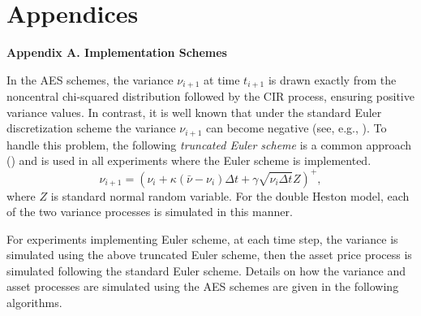 \documentclass[]{interact}
\theoremstyle{plain}%
\theoremstyle{definition}
\theoremstyle{remark}
\begin{document}
\section{Appendices}


\noindent\textbf{Appendix A. Implementation Schemes}\medskip

In the AES schemes, the variance $\nu_{i+1}$ at time $t_{i+1}$ is drawn exactly from the noncentral chi-squared distribution followed by the CIR process, ensuring positive variance values. In contrast, it is well known that under the standard Euler discretization scheme the variance $\nu_{i+1}$ can become negative (see, e.g., \cite{oosterlee2019mathematical}). To handle this problem, the following \emph{truncated Euler scheme} is a common approach (\cite{lordetal}) and is used in all experiments where the Euler scheme is implemented.
\[  \nu_{i+1}= \left(\nu_{i} +\kappa\left(\bar{\nu}-\nu_{i}  \right) \Delta t+\gamma \sqrt{\nu_{i}\Delta t} Z \right)^+, \]
where $Z$ is standard normal random variable. For the double Heston model, each of the two variance processes is simulated in this manner. 

For experiments implementing Euler scheme, at each time step, the variance is simulated using the above truncated Euler scheme, then the asset price process is simulated following the standard Euler scheme.  Details on how the variance and asset processes are simulated using the AES schemes are given in the following algorithms. 
\end{document}
